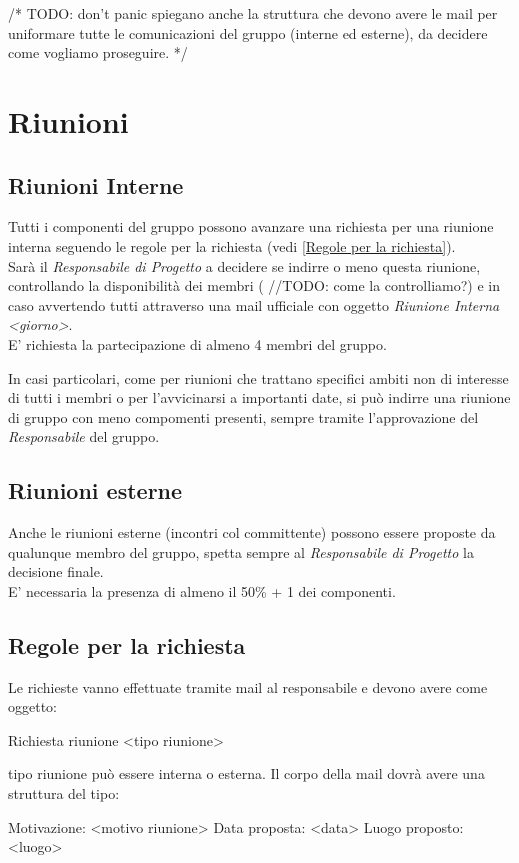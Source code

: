 \documentclass{scalatekids-article}
\begin{document}
/*
TODO: don't panic spiegano anche la struttura che devono avere le mail per uniformare tutte le comunicazioni del gruppo (interne ed esterne), da decidere come vogliamo proseguire.
*/

\section{Riunioni}

\subsection{Riunioni Interne}
Tutti i componenti del gruppo possono avanzare una richiesta per una riunione interna seguendo le regole per la richiesta (vedi \ref{Regole per la richiesta}).\\
Sarà il \textit{Responsabile di Progetto} a decidere se indirre o meno questa riunione, controllando la disponibilità dei membri ( //TODO: come la controlliamo?) e in caso avvertendo tutti attraverso una mail ufficiale con oggetto \textit{Riunione Interna <giorno>}.\\
E' richiesta la partecipazione di almeno 4 membri del gruppo.

In casi particolari, come per riunioni che trattano specifici ambiti non di interesse di tutti i membri o per l'avvicinarsi a importanti date, si può indirre una riunione di gruppo con meno compomenti presenti, sempre tramite l'approvazione del \textit{Responsabile} del gruppo.

\subsection{Riunioni esterne}
Anche le riunioni esterne (incontri col committente) possono essere proposte da qualunque membro del gruppo, spetta sempre al \textit{Responsabile di Progetto} la decisione finale.\\
E' necessaria la presenza di almeno il 50\% + 1 dei componenti.

\subsection{Regole per la richiesta}
Le richieste vanno effettuate tramite mail al responsabile e devono avere come oggetto:
\begin{center}
  Richiesta riunione <tipo riunione>
\end{center}
tipo riunione può essere interna o esterna.
Il corpo della mail dovrà avere una struttura del tipo:
\begin{center}
  Motivazione: <motivo riunione>
  Data proposta: <data>
  Luogo proposto: <luogo>
\end{center}
\end{document}
